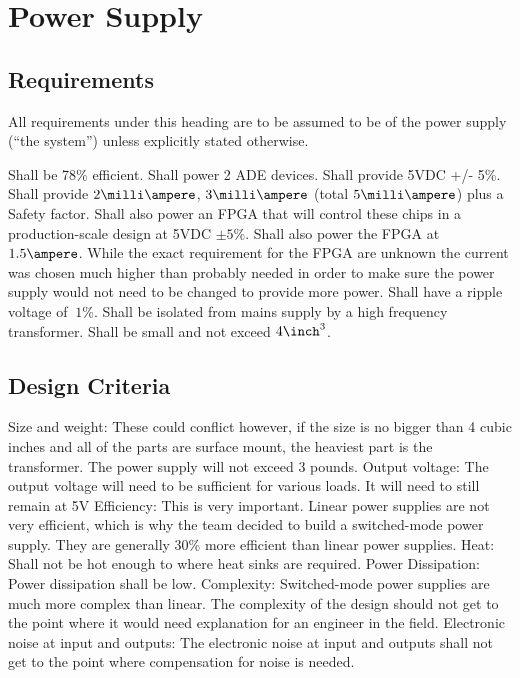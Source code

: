 \section{Power Supply}
\subsection{Requirements}
All requirements under this heading are to be assumed to be of the power supply (``the system'') unless explicitly stated otherwise.
\begin{outline}[enumerate]
\1 Shall be 78\% efficient.
\1 Shall power 2 ADE devices.
\1 Shall provide 5VDC +/- 5\%.
\1 Shall provide $2\milli\ampere$, $3\milli\ampere$ (total $5\milli\ampere$) plus a Safety factor.
\1 Shall also power an FPGA that will control these chips in a production-scale design at 5VDC $\pm5\%$.
\1 Shall also power the FPGA at $1.5\ampere$. 
\2 While the exact requirement for the FPGA are unknown the current was chosen much higher than probably needed in order to make sure the power supply would not need to be changed to provide more power.
\1 Shall have a ripple voltage of $~1\%$.
\1 Shall be isolated from mains supply by a high frequency transformer.
\1 Shall be small and not exceed $4\inch^3$.
\end{outline}
\subsection{Design Criteria}
\begin{outline}[enumerate]
\1 Size and weight: These could conflict however, if the size is no bigger than 4 cubic inches and all of the parts are surface mount, the heaviest part is the transformer. The power supply will not exceed 3 pounds.
\1 Output voltage: The output voltage will need to be sufficient for various loads. It will need to still remain at 5V
\1  Efficiency: This is very important. Linear power supplies are not very efficient, which is why the team decided to build a switched-mode power supply. They are generally 30\% more efficient than linear power supplies. 
\1 Heat: Shall not be hot enough to where heat sinks are required.
\1 Power Dissipation: Power dissipation shall be low.
\1 Complexity: Switched-mode power supplies are much more complex than linear. The complexity of the design should not get to the point where it would need explanation for an engineer in the field. 
\1 Electronic noise at input and outputs: The electronic noise at input and outputs shall not get to the point where compensation for noise is needed.
\end{outline}
